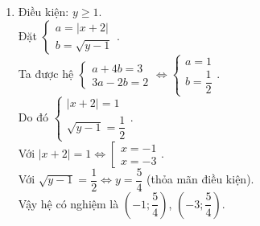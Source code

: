 \begin{bt}
{\begin{enumerate}
			\item 
			Điều kiện: $y \ge 1$.\\
			Đặt $\begin{cases} a = \left| x+2 \right|\\ b = \sqrt{y-1} \end{cases}$.\\ 
			Ta được hệ $\begin{cases} a + 4b = 3\\ 3a  - 2b = 2\end{cases} \Leftrightarrow \begin{cases} a = 1\\ b = \dfrac{1}{2} \end{cases}$. \\
			Do đó $\begin{cases} \left| x+2 \right| =1\\  \sqrt{y-1} =  \dfrac{1}{2} \end{cases}$.\\ 
			Với $\left| x+2 \right| =1 \Leftrightarrow \left[\begin{array}{l} x = -1\\ x=-3\end{array}\right.$.\\
			Với $\sqrt{y-1}=\dfrac{1}{2} \Leftrightarrow y=\dfrac{5}{4}$
			(thỏa mãn điều kiện).\\
			Vậy hệ có nghiệm là $\left(-1; \dfrac{5}{4} \right)$, $\left(-3; \dfrac{5}{4} \right)$.
		\end{enumerate}
	} 
\end{bt}

